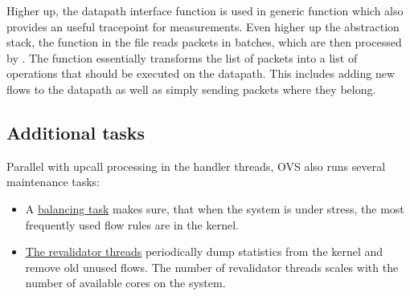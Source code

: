 Higher up, the  datapath interface function is used in generic \href{https://github.com/openvswitch/ovs/blob/e90a0727f17f6ad915a32735a8c0b282f2c8cd6f/lib/dpif.c\#L1591-L1611}{} function which also provides an useful tracepoint \href{https://github.com/openvswitch/ovs/blob/e90a0727f17f6ad915a32735a8c0b282f2c8cd6f/lib/dpif.c\#L1618}{} for measurements. Even higher up the abstraction stack, the function \href{https://github.com/openvswitch/ovs/blob/e90a0727f17f6ad915a32735a8c0b282f2c8cd6f/ofproto/ofproto-dpif-upcall.c\#L829-L830}{} in the file  reads packets in batches, which are then processed by \href{https://github.com/openvswitch/ovs/blob/e90a0727f17f6ad915a32735a8c0b282f2c8cd6f/ofproto/ofproto-dpif-upcall.c\#L1639-L1641}{}. The  function essentially transforms the list of packets into a list of operations that should be executed on the datapath. This includes adding new flows to the datapath as well as simply sending packets where they belong.

\subsection{Additional  tasks}

Parallel with upcall processing in the handler threads, OVS also runs several maintenance tasks:
\begin{itemize}
    \item A \href{https://github.com/openvswitch/ovs/blob/e90a0727f17f6ad915a32735a8c0b282f2c8cd6f/ofproto/ofproto-dpif-upcall.c\#L3312-L3336}{balancing task} makes sure, that when the system is under stress, the most frequently used flow rules are in the kernel.
    \item \href{https://github.com/openvswitch/ovs/blob/e90a0727f17f6ad915a32735a8c0b282f2c8cd6f/ofproto/ofproto-dpif-upcall.c\#L83-L111}{The revalidator threads} periodically dump statistics from the kernel and remove old unused flows. The number of revalidator threads scales with the number of available cores on the system.
\end{itemize}

